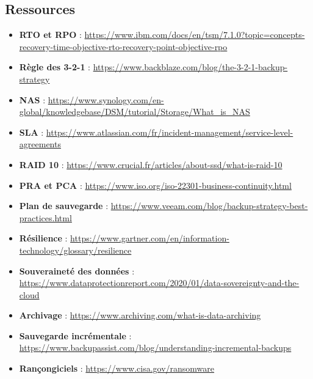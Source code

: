 \subsection*{Ressources}
{}

\begin{itemize}
	\item \textbf{RTO et RPO} : \url{https://www.ibm.com/docs/en/tsm/7.1.0?topic=concepts-recovery-time-objective-rto-recovery-point-objective-rpo}
	\item \textbf{Règle des 3-2-1} : \url{https://www.backblaze.com/blog/the-3-2-1-backup-strategy}
	\item \textbf{NAS} : \url{https://www.synology.com/en-global/knowledgebase/DSM/tutorial/Storage/What_is_NAS}
	\item \textbf{SLA} : \url{https://www.atlassian.com/fr/incident-management/service-level-agreements}
	\item \textbf{RAID 10} : \url{https://www.crucial.fr/articles/about-ssd/what-is-raid-10}
	\item \textbf{PRA et PCA} : \url{https://www.iso.org/iso-22301-business-continuity.html}
	\item \textbf{Plan de sauvegarde} : \url{https://www.veeam.com/blog/backup-strategy-best-practices.html}
	\item \textbf{Résilience} : \url{https://www.gartner.com/en/information-technology/glossary/resilience}
	\item \textbf{Souveraineté des données} : \url{https://www.dataprotectionreport.com/2020/01/data-sovereignty-and-the-cloud}
	\item \textbf{Archivage} : \url{https://www.archiving.com/what-is-data-archiving}
	\item \textbf{Sauvegarde incrémentale} : \url{https://www.backupassist.com/blog/understanding-incremental-backups}
	\item \textbf{Rançongiciels} : \url{https://www.cisa.gov/ransomware}
\end{itemize}
